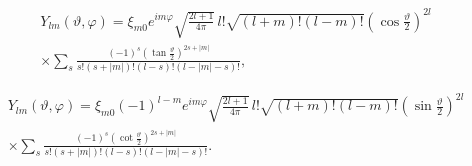 \begin{corrected}\begin{multline}
Y_{l m}(\vartheta, \varphi)=\xi_{m 0} e^{i m \varphi} \sqrt{\frac{2 l+1}{4 \pi}} \, l! \sqrt{(l+m)!(l-m)!}\left(\cos \frac{\vartheta}{2}\right)^{2 l}  \\
\times \sum_{s} \frac{(-1)^{s}\left(\tan \frac{\vartheta}{2}\right)^{2 s+|m|}}{s!(s+|m|)!(l-s)!(l-|m|-s)!},  \label{eq:5:2:15}
\end{multline}
\end{corrected}
\begin{multline}
Y_{l m}(\vartheta, \varphi)=\xi_{m 0}(-1)^{l-m} e^{i m \varphi} \sqrt{\frac{2 l+1}{4 \pi}} \, l! \sqrt{(l+m)!(l-m)!}\left(\sin \frac{\vartheta}{2}\right)^{2 l} \\
\times \sum_{s} \frac{(-1)^{s}\left(\cot \frac{\vartheta}{2}\right)^{2 s+|m|}}{s!(s+|m|)!(l-s)!(l-|m|-s)!} .\label{eq:5:2:16}
\end{multline}

